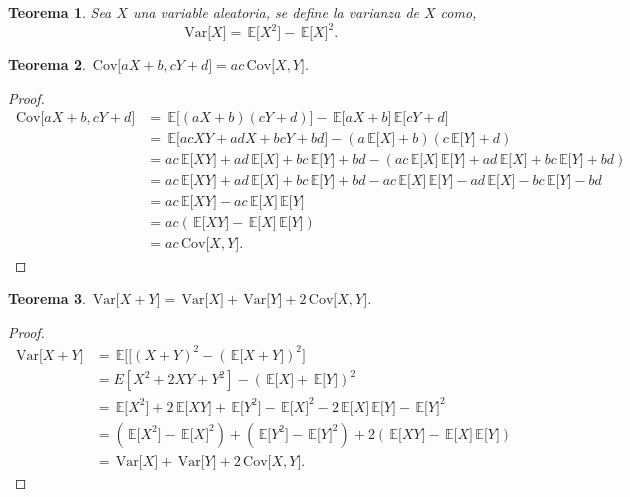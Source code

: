 \documentclass[12pt,letterpaper]{article}
\newcommand\var[1]{\, \mathrm{Var}\lbrack #1 \rbrack}
\newcommand\cov[1]{\, \mathrm{Cov} \lbrack #1 \rbrack}
\newcommand\esp[1]{\, \mathbb{E} \lbrack #1 \rbrack}
\newtheorem{teo}{Teorema}
\begin{document}
\begin{teo}
Sea $X$ una variable aleatoria, se define la varianza de $X$ como,
\begin{equation}
\var{X} = \esp{X^2} - \esp{X}^2.
\end{equation}
\end{teo}

\begin{teo}
$ \cov{aX +b, cY+d} = ac \cov{X, Y}.$
\end{teo}

\begin{proof}
\begin{align*}
 \cov{aX +b, cY+d} &= \esp{(aX+b)(cY+d)} - \esp{aX+b}\esp{cY+d} \\
&= \esp{acXY + adX + bcY +bd} - (a \esp{X} + b)(c\esp{Y}+d) \\
&= ac\esp{XY} + ad\esp{X} + bc\esp{Y} + bd - (ac\esp{X}\esp{Y} + ad\esp{X} + bc\esp{Y} + bd) \\
&= ac\esp{XY} + ad\esp{X} + bc\esp{Y} + bd - ac\esp{X}\esp{Y} - ad\esp{X} - bc\esp{Y} - bd \\
&= ac\esp{XY} - ac\esp{X}\esp{Y} \\
&=ac(\esp{XY} - \esp{X}\esp{Y}) \\
&=ac  \cov{X,Y}.
\end{align*}
\end{proof}

\begin{teo}
$\var{X+Y} = \var{X} + \var{Y} + 2 \cov{X, Y}$.
\end{teo}

\begin{proof}
\begin{align*}
\var{X+Y} &= \esp{[\left(X+Y\right)^2 - \left(\esp{X+Y}\right)^2} \\ &= E[X^2 + 2XY +Y^2] - \left(\esp{X} + \esp{Y}\right)^2 \\
&= \esp{X^2} + 2\esp{XY} + \esp{Y^2} - \esp{X}^2 - 2\esp{X}\esp{Y} - \esp{Y}^2 \\ 
&= (\esp{X^2} - \esp{X}^2) + (\esp{Y^2} - \esp{Y}^2) + 2(\esp{XY} - \esp{X}\esp{Y}) \\ 
&= \var{X} + \var{Y} + 2\cov{X, Y}.	
\end{align*}
\end{proof}
 

\end{document}
